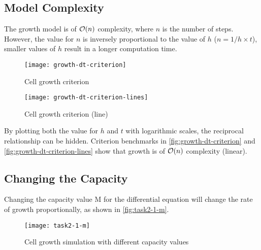 \clearpage

\subsection{Model Complexity}

The growth model is of $\mathcal{O}(n)$ complexity, where $n$ is the number of steps.
However, the value for $n$ is inversely proportional to the value of $h$ ($n = 1/h \times t$), 
smaller values of $h$ result in a longer computation time.



\begin{figure}[ht]
    \centering
    \texttt{[image: growth-dt-criterion]}
    \caption[Cell growth criterion]{Cell growth criterion}
    \label{fig:growth-dt-criterion}
\end{figure}

\begin{figure}[ht]
    \centering
    \texttt{[image: growth-dt-criterion-lines]}
    \caption[Cell growth criterion (line)]{Cell growth criterion (line)}
    \label{fig:growth-dt-criterion-lines}
\end{figure}

By plotting both the value for $h$ and $t$ with logarithmic scales, the reciprocal relationship can be hidden.
Criterion benchmarks in \autoref{fig:growth-dt-criterion} and \autoref{fig:growth-dt-criterion-lines} show that growth is of $\mathcal{O}(n)$ complexity (linear).


\clearpage

\subsection{Changing the Capacity}

Changing the capacity value M for the differential equation will change the rate of growth proportionally, as shown in \autoref{fig:task2-1-m}. 

\begin{figure}[ht]
    \centering
    \texttt{[image: task2-1-m]}
    \caption[Cell growth simulation with different capacity values]{Cell growth simulation with different capacity values}
    \label{fig:task2-1-m}
\end{figure}

